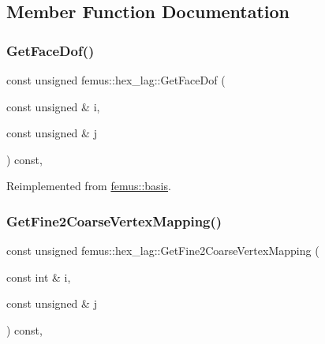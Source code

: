 \subsection{Member Function Documentation}
\mbox{\label{classfemus_1_1hex__lag_a55c8cc6a3fa975cbc7a640c201ae2204}} 
\subsubsection{\texorpdfstring{Get\+Face\+Dof()}{GetFaceDof()}}
{\footnotesize\ttfamily const unsigned femus\+::hex\+\_\+lag\+::\+Get\+Face\+Dof (\begin{DoxyParamCaption}\item[{const unsigned \&}]{i,  }\item[{const unsigned \&}]{j }\end{DoxyParamCaption}) const\hspace{0.3cm}{\ttfamily [inline]}, {\ttfamily [virtual]}}



Reimplemented from \mbox{\hyperlink{classfemus_1_1basis_a06f93864b6ce0925d41bf08173dc2500}{femus\+::basis}}.

\mbox{\label{classfemus_1_1hex__lag_a6146b93f321a26a7a40cf3cf51a3d802}} 
\subsubsection{\texorpdfstring{Get\+Fine2\+Coarse\+Vertex\+Mapping()}{GetFine2CoarseVertexMapping()}}
{\footnotesize\ttfamily const unsigned femus\+::hex\+\_\+lag\+::\+Get\+Fine2\+Coarse\+Vertex\+Mapping (\begin{DoxyParamCaption}\item[{const int \&}]{i,  }\item[{const unsigned \&}]{j }\end{DoxyParamCaption}) const\hspace{0.3cm}{\ttfamily [inline]}, {\ttfamily [virtual]}}



